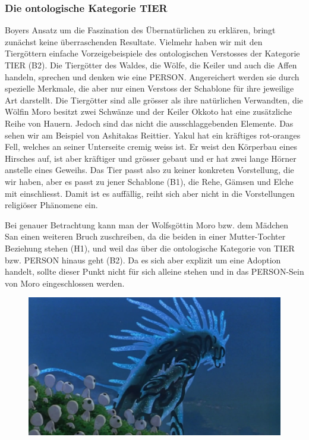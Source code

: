 \subsubsection{Die ontologische Kategorie TIER} 
Boyers Ansatz um die Faszination des Übernatürlichen zu erklären, bringt zunächst keine überraschenden Resultate. Vielmehr haben wir mit den Tiergöttern einfache Vorzeigebeispiele des ontologischen Verstosses der Kategorie TIER (B2). Die Tiergötter des Waldes, die Wölfe, die Keiler und auch die Affen handeln, sprechen und denken wie eine PERSON. Angereichert werden sie durch spezielle Merkmale, die aber nur einen Verstoss der Schablone für ihre jeweilige Art darstellt. Die Tiergötter sind alle grösser als ihre natürlichen Verwandten, die Wölfin Moro besitzt zwei Schwänze und der Keiler Okkoto hat eine zusätzliche Reihe von Hauern. Jedoch sind das nicht die ausschlaggebenden Elemente. Das sehen wir am Beispiel von Ashitakas Reittier. Yakul hat ein kräftiges rot-oranges Fell, welches an seiner Unterseite cremig weiss ist. Er weist den Körperbau eines Hirsches auf, ist aber kräftiger und grösser gebaut und er hat zwei lange Hörner anstelle eines Geweihs. Das Tier passt also zu keiner konkreten Vorstellung, die wir haben, aber es passt zu jener Schablone (B1), die Rehe, Gämsen und Elche mit einschliesst. Damit ist es auffällig, reiht sich aber nicht in die Vorstellungen religiöser Phänomene ein. 

Bei genauer Betrachtung kann man der Wolfsgöttin Moro bzw. dem Mädchen San einen weiteren Bruch zuschreiben, da die beiden in einer Mutter-Tochter Beziehung stehen (H1), und weil das über die ontologische Kategorie von TIER bzw. PERSON hinaus geht (B2). Da es sich aber explizit um eine Adoption handelt, sollte dieser Punkt nicht für sich alleine stehen und in das PERSON-Sein von Moro eingeschlossen werden. 

\begin{figure}
  \centering
  \includegraphics[width=.8\linewidth]{images/00-57-44_mononoke.png}
  \label{fig:test2}
\end{figure}

